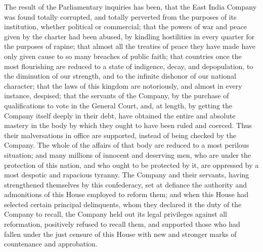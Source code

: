 The result of the Parliamentary inquiries has been, that the East India Company was found totally corrupted, and totally perverted from the purposes of its institution, whether political or commercial; that the powers of war and peace given by the charter had been abused, by kindling hostilities in every quarter for the purposes of rapine; that almost all the treaties of peace they have made have only given cause to so many breaches of public faith; that countries once the most flourishing are reduced to a state of indigence, decay, and depopulation, to the diminution of our strength, and to the infinite dishonor of our national character; that the laws of this kingdom are notoriously, and almost in every instance, despised; that the servants of the Company, by the purchase of qualifications to vote in the General Court, and, at length, by getting the Company itself deeply in their debt, have obtained the entire and absolute mastery in the body by which they ought to have been ruled and coerced. Thus their malversations in office are supported, instead of being checked by the Company. The whole of the affairs of that body are reduced to a most perilous situation; and many millions of innocent and deserving men, who are under the protection of this nation, and who ought to be protected by it, are oppressed by a most despotic and rapacious tyranny. The Company and their servants, having strengthened themselves by this confederacy, set at defiance the authority and admonitions of this House employed to reform them; and when this House had selected certain principal delinquents, whom they declared it the duty of the Company to recall, the Company held out its legal privileges against all reformation, positively refused to recall them, and supported those who had fallen under the just censure of this House with new and stronger marks of countenance and approbation.

